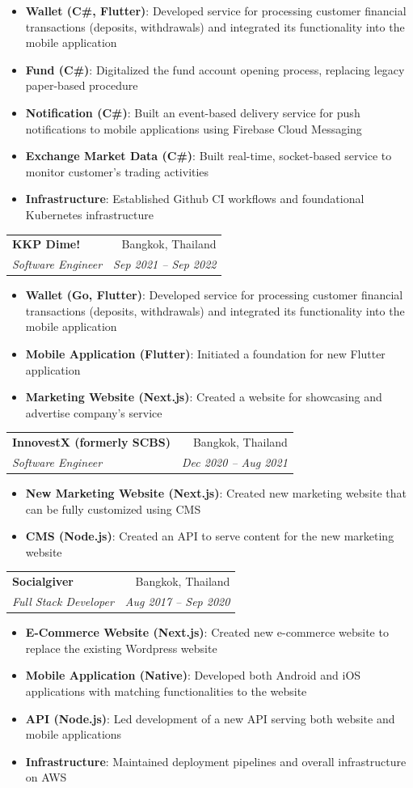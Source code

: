 \documentclass[letterpaper,11pt]{article}
\makeatletter
\newcommand{\resumeItem}[2]{
  \item\small{
    \textbf{#1}{: #2 \vspace{-2pt}}
  }
}
\newcommand{\resumeSubheading}[4]{
  \vspace{-1pt}\item
    \begin{tabular*}{0.97\textwidth}[t]{l@{\extracolsep{\fill}}r}
      \textbf{#1} & #2 \\
      \textsl{\small#3} & \textsl{\small #4} \\
    \end{tabular*}\vspace{-5pt}
}
\newcommand{\resumeItemListStart}{\begin{itemize}}
\newcommand{\resumeItemListEnd}{\end{itemize}\vspace{-5pt}}
\makeatother
\begin{document}
      \resumeItemListStart
        \resumeItem{Wallet (C\#, Flutter)}
          {Developed service for processing customer financial transactions (deposits, withdrawals) and integrated its functionality into the mobile application}
        \resumeItem{Fund (C\#)}
          {Digitalized the fund account opening process, replacing legacy paper-based procedure}
        \resumeItem{Notification (C\#)}
          {Built an event-based delivery service for push notifications to mobile applications using Firebase Cloud Messaging}
        \resumeItem{Exchange Market Data (C\#)}
          {Built real-time, socket-based service to monitor customer's trading activities}
        \resumeItem{Infrastructure}
          {Established Github CI workflows and foundational Kubernetes infrastructure}
      \resumeItemListEnd

    \resumeSubheading
      {KKP Dime!}{Bangkok, Thailand}
      {Software Engineer}{Sep 2021 -- Sep 2022}
      \resumeItemListStart
        \resumeItem{Wallet (Go, Flutter)}
          {Developed service for processing customer financial transactions (deposits, withdrawals) and integrated its functionality into the mobile application}
        \resumeItem{Mobile Application (Flutter)}
          {Initiated a foundation for new Flutter application}
        \resumeItem{Marketing Website (Next.js)}
          {Created a website for showcasing and advertise company's service}
      \resumeItemListEnd

    \resumeSubheading
      {InnovestX (formerly SCBS)}{Bangkok, Thailand}
      {Software Engineer}{Dec 2020 -- Aug 2021}
      \resumeItemListStart
        \resumeItem{New Marketing Website (Next.js)}
          {Created new marketing website that can be fully customized using CMS}
        \resumeItem{CMS (Node.js)}
          {Created an API to serve content for the new marketing website}
      \resumeItemListEnd

    \resumeSubheading
      {Socialgiver}{Bangkok, Thailand}
      {Full Stack Developer}{Aug 2017 -- Sep 2020}
      \resumeItemListStart
        \resumeItem{E-Commerce Website (Next.js)}
          {Created new e-commerce website to replace the existing Wordpress website}
        \resumeItem{Mobile Application (Native)}
          {Developed both Android and iOS applications with matching functionalities to the website}
        \resumeItem{API (Node.js)}
          {Led development of a new API serving both website and mobile applications}
        \resumeItem{Infrastructure}
          {Maintained deployment pipelines and overall infrastructure on AWS}
      \resumeItemListEnd
\end{document}
